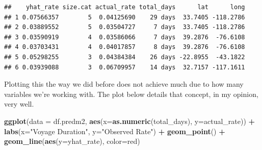 \documentclass[
  11,
]{book}
\newenvironment{Shaded}{\begin{snugshade}}{\end{snugshade}}
\newcommand{\AttributeTok}[1]{\textcolor[rgb]{0.27,0.27,0.27}{#1}}
\newcommand{\ConstantTok}[1]{\textcolor[rgb]{0.37,0.37,0.37}{#1}}
\newcommand{\DecValTok}[1]{\textcolor[rgb]{0.06,0.06,0.06}{#1}}
\newcommand{\FunctionTok}[1]{\textcolor[rgb]{0.27,0.27,0.27}{\textbf{#1}}}
\newcommand{\NormalTok}[1]{#1}
\newcommand{\OtherTok}[1]{\textcolor[rgb]{0.37,0.37,0.37}{#1}}
\newcommand{\SpecialCharTok}[1]{\textcolor[rgb]{0.43,0.43,0.43}{\textbf{#1}}}
\newcommand{\StringTok}[1]{\textcolor[rgb]{0.5,0.5,0.5}{#1}}
\begin{document}
\begin{Shaded}
\end{Shaded}

\begin{verbatim}
##    yhat_rate size.cat actual_rate total_days      lat      long
## 1 0.07566357        5  0.04125690    29 days  33.7405 -118.2786
## 2 0.03889552        5  0.03504727     7 days  33.7405 -118.2786
## 3 0.03590919        4  0.03586066     7 days  39.2876  -76.6108
## 4 0.03703431        4  0.04017857     8 days  39.2876  -76.6108
## 5 0.05298255        3  0.04384384    26 days -22.8955  -43.1822
## 6 0.03939088        3  0.06709957    14 days  32.7157 -117.1611
\end{verbatim}

Plotting this the way we did before does not achieve much due to how many variables we're working with. The plot below details that concept, in my opinion, very well.

\begin{Shaded}
\begin{Highlighting}[]
\FunctionTok{ggplot}\NormalTok{(}\AttributeTok{data =}\NormalTok{ df.predm2, }\FunctionTok{aes}\NormalTok{(}\AttributeTok{x=}\FunctionTok{as.numeric}\NormalTok{(total\_days), }\AttributeTok{y=}\NormalTok{actual\_rate)) }\SpecialCharTok{+}
  \FunctionTok{labs}\NormalTok{(}\AttributeTok{x=}\StringTok{"Voyage Duration"}\NormalTok{, }\AttributeTok{y=}\StringTok{"Observed Rate"}\NormalTok{) }\SpecialCharTok{+}
  \FunctionTok{geom\_point}\NormalTok{() }\SpecialCharTok{+}
  \FunctionTok{geom\_line}\NormalTok{(}\FunctionTok{aes}\NormalTok{(}\AttributeTok{y=}\NormalTok{yhat\_rate), }\AttributeTok{color=}\StringTok{\textquotesingle{}red\textquotesingle{}}\NormalTok{)}
\end{Highlighting}
\end{Shaded}
\end{document}
